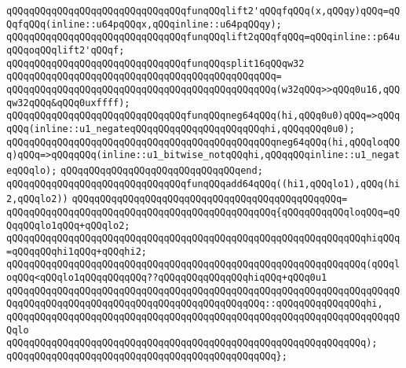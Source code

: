 \verb|qQQqqQQqqQQqqQQqqQQqqQQqqQQqqQQqfunqQQqlift2'qQQqfqQQq(x,qQQqy)qQQq=qQQqfqQQq(inline::u64pqQQqx,qQQqinline::u64pqQQqy);|\newline
\verb|qQQqqQQqqQQqqQQqqQQqqQQqqQQqqQQqfunqQQqlift2qQQqfqQQq=qQQqinline::p64uqQQqoqQQqlift2'qQQqf;|\newline
\newline
\verb|qQQqqQQqqQQqqQQqqQQqqQQqqQQqqQQqfunqQQqsplit16qQQqw32|\newline
\verb|qQQqqQQqqQQqqQQqqQQqqQQqqQQqqQQqqQQqqQQqqQQqqQQq=|\newline
\verb|qQQqqQQqqQQqqQQqqQQqqQQqqQQqqQQqqQQqqQQqqQQqqQQq(w32qQQq>>qQQq0u16,qQQqw32qQQq&qQQq0uxffff);|\newline
\newline
\verb|qQQqqQQqqQQqqQQqqQQqqQQqqQQqqQQqfunqQQqneg64qQQq(hi,qQQq0u0)qQQq=>qQQqqQQq(inline::u1_negateqQQqqQQqqQQqqQQqqQQqqQQqhi,qQQqqQQq0u0);|\newline
\verb|qQQqqQQqqQQqqQQqqQQqqQQqqQQqqQQqqQQqqQQqqQQqqQQqneg64qQQq(hi,qQQqloqQQq)qQQq=>qQQqqQQq(inline::u1_bitwise_notqQQqhi,qQQqqQQqinline::u1_negateqQQqlo);|\newline
\verb|qQQqqQQqqQQqqQQqqQQqqQQqqQQqqQQqend;|\newline
\newline
\verb|qQQqqQQqqQQqqQQqqQQqqQQqqQQqqQQqfunqQQqadd64qQQq((hi1,qQQqlo1),qQQq(hi2,qQQqlo2))|\newline
\verb|qQQqqQQqqQQqqQQqqQQqqQQqqQQqqQQqqQQqqQQqqQQqqQQq=|\newline
\verb|qQQqqQQqqQQqqQQqqQQqqQQqqQQqqQQqqQQqqQQqqQQqqQQq{qQQqqQQqqQQqloqQQq=qQQqqQQqlo1qQQq+qQQqlo2;|\newline
\verb|qQQqqQQqqQQqqQQqqQQqqQQqqQQqqQQqqQQqqQQqqQQqqQQqqQQqqQQqqQQqqQQqhiqQQq=qQQqqQQqhi1qQQq+qQQqhi2;|\newline
\newline
\verb|qQQqqQQqqQQqqQQqqQQqqQQqqQQqqQQqqQQqqQQqqQQqqQQqqQQqqQQqqQQqqQQq(qQQqloqQQq<qQQqlo1qQQqqQQqqQQq??qQQqqQQqqQQqqQQqhiqQQq+qQQq0u1|\newline
\verb|qQQqqQQqqQQqqQQqqQQqqQQqqQQqqQQqqQQqqQQqqQQqqQQqqQQqqQQqqQQqqQQqqQQqqQQqqQQqqQQqqQQqqQQqqQQqqQQqqQQqqQQqqQQqqQQqqQQq::qQQqqQQqqQQqqQQqhi,|\newline
\newline
\verb|qQQqqQQqqQQqqQQqqQQqqQQqqQQqqQQqqQQqqQQqqQQqqQQqqQQqqQQqqQQqqQQqqQQqqQQqlo|\newline
\verb|qQQqqQQqqQQqqQQqqQQqqQQqqQQqqQQqqQQqqQQqqQQqqQQqqQQqqQQqqQQqqQQq);|\newline
\verb|qQQqqQQqqQQqqQQqqQQqqQQqqQQqqQQqqQQqqQQqqQQqqQQq};|\newline
